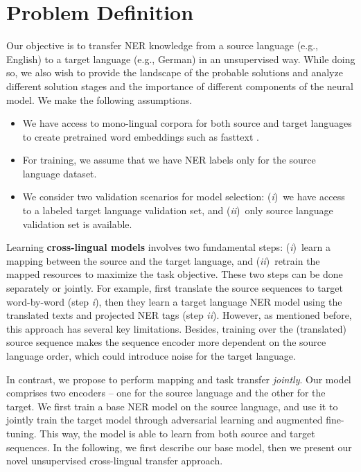 \documentclass[letterpaper]{article} \usepackage{aaai20}  \usepackage{times}  \usepackage{helvet} \usepackage{courier}  \usepackage[hyphens]{url}  \usepackage{graphicx} \urlstyle{rm} \def\UrlFont{\rm}  \usepackage{graphicx}  \frenchspacing  \setlength{\pdfpagewidth}{8.5in}  \setlength{\pdfpageheight}{11in}
\newcommand{\Ni}{({\em i})~}
\newcommand{\Nii}{({\em ii})~}
\begin{document}
\section{Problem Definition}

Our objective is to transfer NER knowledge from a source language (e.g., English) to a target language (e.g., German) in an unsupervised way. While doing so, we also wish to provide the landscape of the probable solutions and analyze different solution stages and the importance of different components of the neural model. We make the following assumptions.


\begin{itemize}[noitemsep]
    \item We have access to mono-lingual corpora for both source and target languages to create  pretrained word embeddings such as fasttext \cite{grave2018learning}. 
    \item For training, we assume that we have NER labels only for the source language dataset.
    \item We consider two validation scenarios for model selection: \Ni we have access to a labeled target language validation set, and \Nii only source language validation set is available. 
\end{itemize}

Learning \textbf{cross-lingual models} involves two fundamental steps: \Ni learn a mapping between the source and the target language, and \Nii retrain the mapped resources to maximize the task objective. These two steps can be done separately or jointly. For example, \cite{cross-ling-cmu} first translate the source sequences to target word-by-word (step \textit{i}), then they learn a target language NER model using the translated texts and projected NER tags (step \textit{ii}). However, as mentioned before, this approach has several key limitations. Besides, training over the (translated) source sequence  makes the sequence encoder more dependent on the source language order, which could introduce noise for the target language. 

In contrast, we propose to perform mapping and task transfer \emph{jointly}. Our model comprises two encoders -- one for the source language and the other for the target. We first train a base NER model on the source language, and use it to jointly train the target model through adversarial learning and augmented fine-tuning. This way, the model is able to learn from both source and target sequences. In the following, we first describe our base model, then we present our novel unsupervised cross-lingual transfer approach. 
\end{document}
